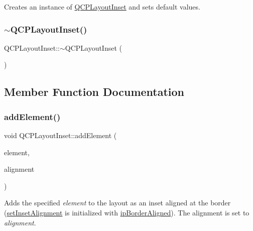 Creates an instance of \mbox{\hyperlink{class_q_c_p_layout_inset}{Q\+C\+P\+Layout\+Inset}} and sets default values. \mbox{\label{class_q_c_p_layout_inset_a7d0e5647b2e92df92abab532441db112}} 
\subsubsection{\texorpdfstring{$\sim$QCPLayoutInset()}{~QCPLayoutInset()}}
{\footnotesize\ttfamily Q\+C\+P\+Layout\+Inset\+::$\sim$\+Q\+C\+P\+Layout\+Inset (\begin{DoxyParamCaption}{ }\end{DoxyParamCaption})\hspace{0.3cm}{\ttfamily [virtual]}}



\subsection{Member Function Documentation}
\mbox{\label{class_q_c_p_layout_inset_ad61529eb576af7f04dff94abb10c745a}} 
\subsubsection{\texorpdfstring{addElement()}{addElement()}\hspace{0.1cm}{\footnotesize\ttfamily [1/2]}}
{\footnotesize\ttfamily void Q\+C\+P\+Layout\+Inset\+::add\+Element (\begin{DoxyParamCaption}\item[{\mbox{\hyperlink{class_q_c_p_layout_element}{Q\+C\+P\+Layout\+Element}} $\ast$}]{element,  }\item[{Qt\+::\+Alignment}]{alignment }\end{DoxyParamCaption})}

Adds the specified {\itshape element} to the layout as an inset aligned at the border (\mbox{\hyperlink{class_q_c_p_layout_inset_a62882a4f9ad58bb0f53da12fde022abe}{set\+Inset\+Alignment}} is initialized with \mbox{\hyperlink{class_q_c_p_layout_inset_a8b9e17d9a2768293d2a7d72f5e298192aa81e7df4a785ddee2229a8f47c46e817}{ip\+Border\+Aligned}}). The alignment is set to {\itshape alignment}.

